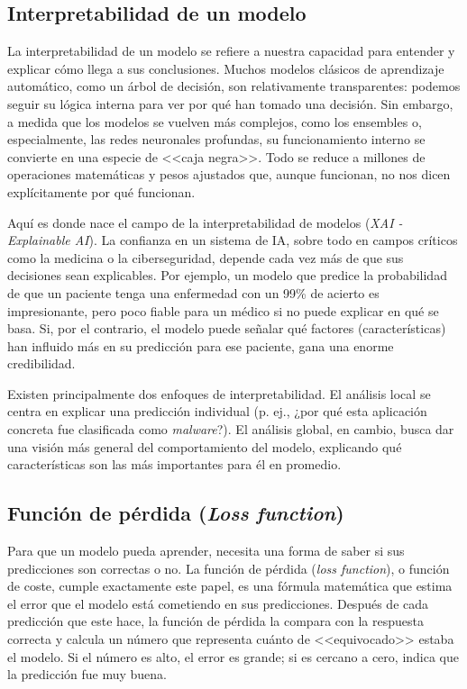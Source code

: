 \subsection{Interpretabilidad de un modelo}

La interpretabilidad de un modelo se refiere a nuestra capacidad para entender y explicar cómo llega a sus conclusiones. Muchos modelos clásicos de aprendizaje automático, como un árbol de decisión, son relativamente transparentes: podemos seguir su lógica interna para ver por qué han tomado una decisión. Sin embargo, a medida que los modelos se vuelven más complejos, como los ensembles o, especialmente, las redes neuronales profundas, su funcionamiento interno se convierte en una especie de <<caja negra>>. Todo se reduce a millones de operaciones matemáticas y pesos ajustados que, aunque funcionan, no nos dicen explícitamente por qué funcionan.

Aquí es donde nace el campo de la interpretabilidad de modelos (\textit{XAI - Explainable AI}). La confianza en un sistema de IA, sobre todo en campos críticos como la medicina o la ciberseguridad, depende cada vez más de que sus decisiones sean explicables. Por ejemplo, un modelo que predice la probabilidad de que un paciente tenga una enfermedad con un 99\% de acierto es impresionante, pero poco fiable para un médico si no puede explicar en qué se basa. Si, por el contrario, el modelo puede señalar qué factores (características) han influido más en su predicción para ese paciente, gana una enorme credibilidad.

Existen principalmente dos enfoques de interpretabilidad. El análisis local se centra en explicar una predicción individual (p. ej., ¿por qué esta aplicación concreta fue clasificada como \textit{malware}?). El análisis global, en cambio, busca dar una visión más general del comportamiento del modelo, explicando qué características son las más importantes para él en promedio.

\subsection{Función de pérdida (\textit{Loss function})}

Para que un modelo pueda aprender, necesita una forma de saber si sus predicciones son correctas o no. La función de pérdida (\textit{loss function}), o función de coste, cumple exactamente este papel, es una fórmula matemática que estima el error que el modelo está cometiendo en sus predicciones. Después de cada predicción que este hace, la función de pérdida la compara con la respuesta correcta y calcula un número que representa cuánto de <<equivocado>> estaba el modelo. Si el número es alto, el error es grande; si es cercano a cero, indica que la predicción fue muy buena.

